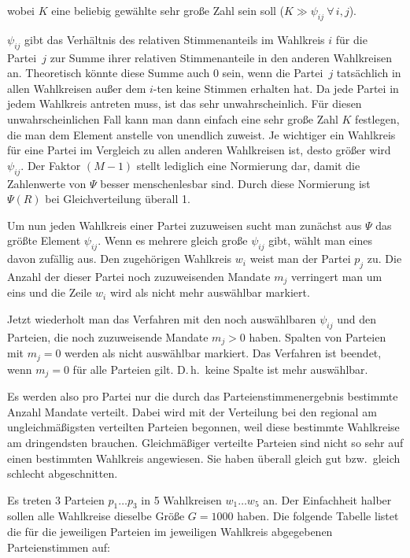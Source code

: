 wobei $K$ eine beliebig gewählte sehr große Zahl sein soll ($K \gg \psi_{ij}\ \forall\,i,j$).

$\psi_{ij}$ gibt das Verhältnis des relativen Stimmenanteils im Wahlkreis $i$ für die Partei~$j$
zur Summe ihrer relativen Stimmenanteile in den anderen Wahlkreisen an. Theoretisch könnte diese
Summe auch 0 sein, wenn die Partei~$j$ tatsächlich in allen Wahlkreisen außer dem $i$-ten keine
Stimmen erhalten hat. Da jede Partei in jedem Wahlkreis antreten muss, ist das sehr
unwahrscheinlich. Für diesen unwahrscheinlichen Fall kann man dann einfach eine sehr große Zahl
$K$ festlegen, die man dem Element anstelle von unendlich zuweist. Je wichtiger ein Wahlkreis für
eine Partei im Vergleich zu allen anderen Wahlkreisen ist, desto größer wird $\psi_{ij}$. Der
Faktor $(M-1)$ stellt lediglich eine Normierung dar, damit die Zahlenwerte von $\Psi$ besser
menschenlesbar sind. Durch diese Normierung ist $\Psi(R)$ bei Gleichverteilung überall 1.

Um nun jeden Wahlkreis einer Partei zuzuweisen sucht man zunächst aus $\Psi$ das größte Element
$\psi_{ij}$. Wenn es mehrere gleich große $\psi_{ij}$ gibt, wählt man eines davon zufällig aus.
Den zugehörigen Wahlkreis $w_i$ weist man der Partei $p_j$ zu. Die Anzahl der dieser Partei noch
zuzuweisenden Mandate $m_j$ verringert man um eins und die Zeile $w_i$ wird als nicht mehr
auswählbar markiert.

Jetzt wiederholt man das Verfahren mit den noch auswählbaren $\psi_{ij}$ und den Parteien, die
noch zuzuweisende Mandate $m_j > 0$ haben. Spalten von Parteien mit $m_j = 0$ werden als nicht
auswählbar markiert. Das Verfahren ist beendet, wenn $m_j = 0$ für alle Parteien gilt. D.\,h.\
keine Spalte ist mehr auswählbar.

Es werden also pro Partei nur die durch das Parteienstimmenergebnis bestimmte Anzahl Mandate
verteilt. Dabei wird mit der Verteilung bei den regional am ungleichmäßigsten verteilten Parteien
begonnen, weil diese bestimmte Wahlkreise am dringendsten brauchen.
Gleichmäßiger verteilte Parteien sind nicht so sehr auf einen bestimmten Wahlkreis angewiesen.
Sie haben überall gleich gut bzw.\ gleich schlecht abgeschnitten.


Es treten 3 Parteien $p_1 \ldots p_3$ in 5 Wahlkreisen $w_1 \ldots w_5$ an. Der Einfachheit
halber sollen alle Wahlkreise dieselbe Größe $G = 1000$ haben. Die folgende Tabelle listet die
für die jeweiligen Parteien im jeweiligen Wahlkreis abgegebenen Parteienstimmen auf:

